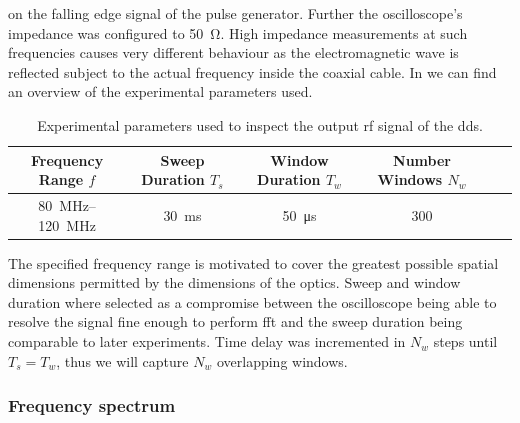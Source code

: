 on the falling edge signal of the pulse generator. Further the oscilloscope's
impedance was configured to \SI{50}{\ohm}. High impedance measurements at
such frequencies causes very different behaviour as the electromagnetic wave
is reflected subject to the actual frequency inside the coaxial cable. In 
 we can find an overview of the experimental
parameters used.
\begin{table}[htb]
  \centering
  \begin{tabular}{cccccc}
    \toprule
    Frequency Range $f$ &
    Sweep Duration $T_s$ &
    Window Duration $T_w$ &
    Number Windows $N_w$ \\
    \midrule
    \SIrange{80}{120}{\mega\hertz} &
    \SI{30}{\milli\second} &
    \SI{50}{\micro\second} &
    300 \\
    \bottomrule
  \end{tabular}
  \caption{Experimental parameters used to inspect the output \gls{rf} signal
    of the \gls{dds}.
  }\label{tab:signal_parameters_dds}
\end{table}
The specified frequency range is motivated to cover the greatest possible
spatial dimensions permitted by the dimensions of the optics. Sweep and
window duration where selected as a compromise between the oscilloscope being
able to resolve the signal fine enough to perform \gls{fft} and the sweep
duration being comparable to later experiments. Time delay was incremented
in $N_w$ steps until $T_s=T_w$, thus we will capture $N_w$ overlapping windows.

\subsubsection{Frequency spectrum}

